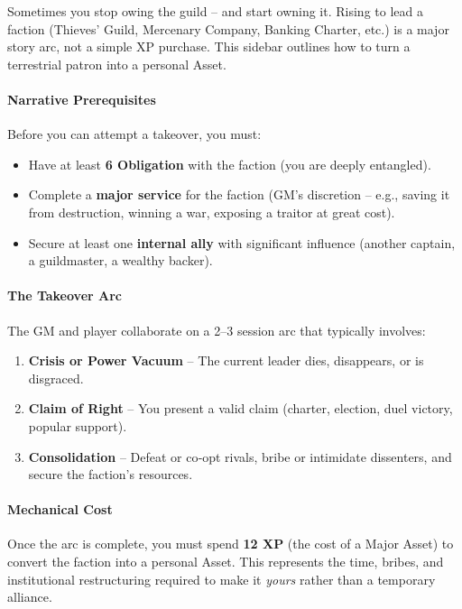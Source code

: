 \begin{tcolorbox}[colback=black!3!white,colframe=black!60!white,title={From Faction to Asset: Taking Over a Terrestrial Patron}]
Sometimes you stop owing the guild – and start owning it. Rising to lead a faction (Thieves’ Guild, Mercenary Company, Banking Charter, etc.) is a major story arc, not a simple XP purchase. This sidebar outlines how to turn a terrestrial patron into a personal Asset.

\paragraph{Narrative Prerequisites}
Before you can attempt a takeover, you must:
\begin{itemize}
  \item Have at least \textbf{6 Obligation} with the faction (you are deeply entangled).
  \item Complete a \textbf{major service} for the faction (GM’s discretion – e.g., saving it from destruction, winning a war, exposing a traitor at great cost).
  \item Secure at least one \textbf{internal ally} with significant influence (another captain, a guildmaster, a wealthy backer).
\end{itemize}

\paragraph{The Takeover Arc}
The GM and player collaborate on a 2–3 session arc that typically involves:
\begin{enumerate}
  \item \textbf{Crisis or Power Vacuum} – The current leader dies, disappears, or is disgraced.
  \item \textbf{Claim of Right} – You present a valid claim (charter, election, duel victory, popular support).
  \item \textbf{Consolidation} – Defeat or co‑opt rivals, bribe or intimidate dissenters, and secure the faction’s resources.
\end{enumerate}

\paragraph{Mechanical Cost}
Once the arc is complete, you must spend \textbf{12 XP} (the cost of a Major Asset) to convert the faction into a personal Asset. This represents the time, bribes, and institutional restructuring required to make it \emph{yours} rather than a temporary alliance.


\end{tcolorbox}
